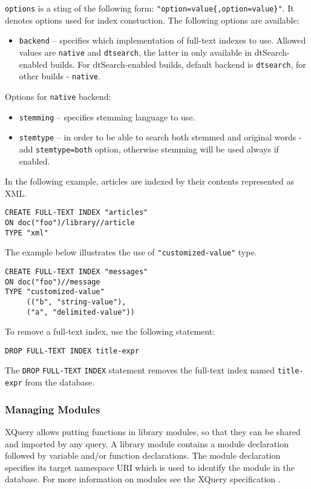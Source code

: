 \documentclass[a4paper,12pt]{article}
\begin{document}
\verb!options! is a sting of the following form:
\verb!"option=value{,option=value}"!. It denotes options used for index
constuction. The following options are available:

\begin{itemize}
\item \verb!backend! -- specifies which implementation of full-text indexes to
use. Allowed values are \verb!native! and \verb!dtsearch!, the latter in only
available in dtSearch-enabled builds. For dtSearch-enabled builds, default
backend is \verb!dtsearch!, for other builds - \verb!native!.
\end{itemize}

Options for \verb!native! backend:

\begin{itemize}
\item \verb!stemming! -- specifies stemming language to use.
\item \verb!stemtype! -- in order to be able to search both stemmed and original
words - add \verb!stemtype=both! option, otherwise stemming will be used always
if enabled.
\end{itemize}


In the following example, articles are indexed by their contents represented as
XML.

\begin{verbatim}
CREATE FULL-TEXT INDEX "articles"
ON doc("foo")/library//article
TYPE "xml"
\end{verbatim}

The example below illustrates the use of \verb!"customized-value"! type.
\begin{verbatim}
CREATE FULL-TEXT INDEX "messages"
ON doc("foo")//message
TYPE "customized-value"
     (("b", "string-value"),
     ("a", "delimited-value"))
\end{verbatim}

To remove a full-text index, use the following statement:
\begin{verbatim}
DROP FULL-TEXT INDEX title-expr
\end{verbatim}

The \verb!DROP! \verb!FULL-TEXT! \verb!INDEX! statement removes the full-text
index named \verb!title-expr! from the database.


\subsubsection{Managing Modules}
XQuery allows putting functions in library modules, so that they can be shared
and imported by any query. A library module contains a module declaration
followed by variable and/or function declarations. The module declaration
specifies its target namespace URI which is used to identify the module in the
database. For more information on modules see the XQuery specification
\cite{paper:query-language}.
\end{document}
